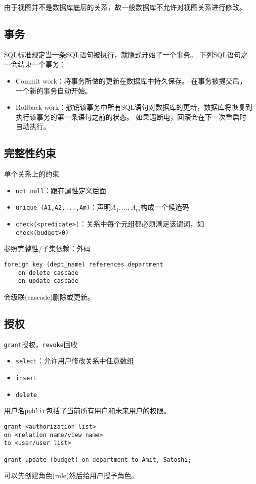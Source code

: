 由于视图并不是数据库底层的关系，故一般数据库不允许对视图关系进行修改。

\subsection{事务}
SQL标准规定当一条SQL语句被执行，就隐式开始了一个事务。
下列SQL语句之一会结束一个事务：
\begin{itemize}
	\item Commit work：将事务所做的更新在数据库中持久保存。
	在事务被提交后，一个新的事务自动开始。
	\item Rollback work：撤销该事务中所有SQL语句对数据库的更新，数据库将恢复到执行该事务的第一条语句之前的状态。
	如果遇断电，回滚会在下一次重启时自动执行。
\end{itemize}

\subsection{完整性约束}
单个关系上的约束
\begin{itemize}
	\item \verb'not null'：跟在属性定义后面
	\item \verb'unique (A1,A2,...,Am)'：声明$A_1,\ldots,A_m$构成一个候选码
	\item \verb'check(<predicate>)'：关系中每个元组都必须满足该谓词，如\verb'check(budget>0)'
\end{itemize}

参照完整性/子集依赖：外码
\begin{lstlisting}
foreign key (dept_name) references department
	on delete cascade
	on update cascade
\end{lstlisting}
会级联(cascade)删除或更新。

\subsection{授权}
\verb'grant'授权，\verb'revoke'回收
\begin{itemize}
	\item \verb'select'：允许用户修改关系中任意数组
	\item \verb'insert'
	\item \verb'delete'
\end{itemize}
用户名\verb'public'包括了当前所有用户和未来用户的权限。

\begin{lstlisting}
grant <authorization list>
on <relation name/view name>
to <user/user list>

grant update (budget) on department to Amit, Satoshi;
\end{lstlisting}

可以先创建角色(role)然后给用户授予角色。